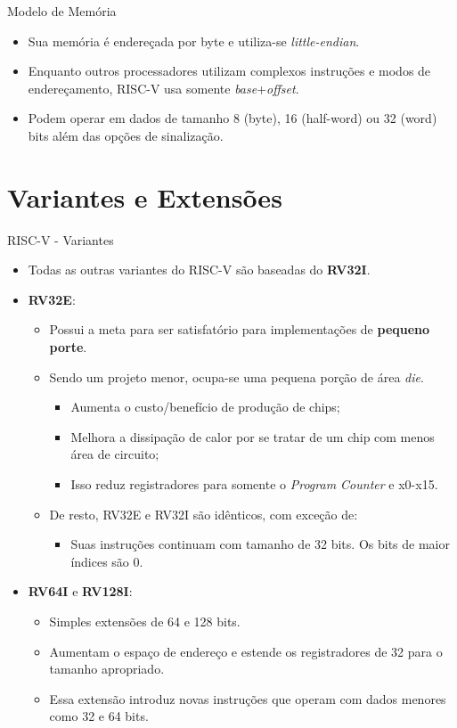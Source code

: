 \documentclass[aspectratio=169]{beamer}
\begin{document}
\begin{frame}{Modelo de Memória}
	\begin{itemize}
		\item Sua memória é endereçada por byte e utiliza-se \textit{little-endian}.
		\item Enquanto outros processadores utilizam complexos instruções e modos de endereçamento, RISC-V usa somente \textit{base}+\textit{offset}.
		\item Podem operar em dados de tamanho 8 (byte), 16 (half-word) ou 32 (word) bits além das opções de sinalização.
	\end{itemize}
\end{frame}

\section{Variantes e Extensões}
\begin{frame}{RISC-V - Variantes}
	\begin{itemize}
		\item Todas as outras variantes do RISC-V são baseadas do \textbf{RV32I}.

			\bigskip

		\item \textbf{RV32E}:
		\begin{itemize}
			\item Possui a meta para ser satisfatório para implementações de \textbf{pequeno porte}.
			\item Sendo um projeto menor, ocupa-se uma pequena porção de área \textit{die}.
			\begin{itemize}
				\item Aumenta o custo/benefício de produção de chips;
				\item Melhora a dissipação de calor por se tratar de um chip com menos área de circuito;
				\item Isso reduz registradores para somente o \textit{Program Counter} e x0-x15.
			\end{itemize}
			\item De resto, RV32E e RV32I são idênticos, com exceção de:
			\begin{itemize}
				\item Suas instruções continuam com tamanho de 32 bits.  Os bits de maior índices são 0.
			\end{itemize}
		\end{itemize}

		\item \textbf{RV64I} e \textbf{RV128I}:
		\begin{itemize}
			\item Simples extensões de 64 e 128 bits.
			\item Aumentam o espaço de endereço e estende os registradores de 32 para o tamanho apropriado.
			\item Essa extensão introduz novas instruções que operam com dados menores como 32 e 64 bits.
		\end{itemize}
	\end{itemize}
\end{frame}
\end{document}
